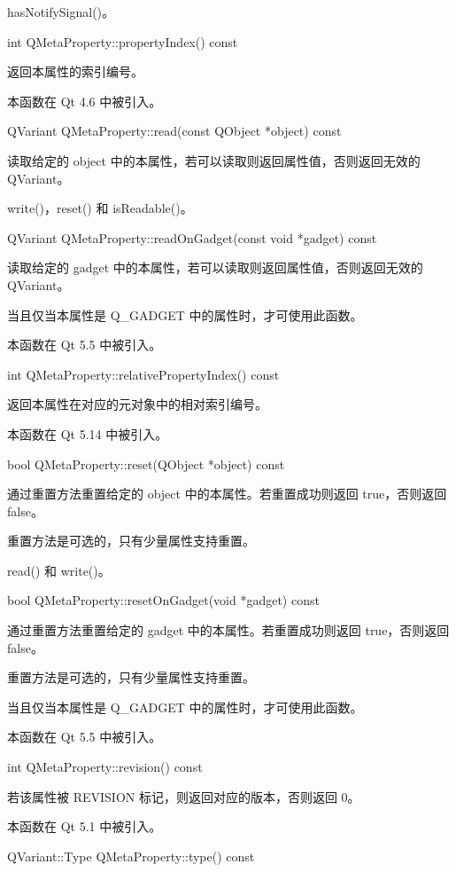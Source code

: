 \begin{seeAlso}
hasNotifySignal()。
\end{seeAlso}

int QMetaProperty::propertyIndex() const

返回本属性的索引编号。

本函数在 Qt 4.6 中被引入。

QVariant QMetaProperty::read(const QObject *object) const

读取给定的 object 中的本属性，若可以读取则返回属性值，否则返回无效的 QVariant。

\begin{seeAlso}
write()，reset() 和 isReadable()。
\end{seeAlso}

QVariant QMetaProperty::readOnGadget(const void *gadget) const

读取给定的 gadget 中的本属性，若可以读取则返回属性值，否则返回无效的 QVariant。

当且仅当本属性是 Q\_GADGET 中的属性时，才可使用此函数。

本函数在 Qt 5.5 中被引入。

int QMetaProperty::relativePropertyIndex() const

返回本属性在对应的元对象中的相对索引编号。

本函数在 Qt 5.14 中被引入。

bool QMetaProperty::reset(QObject *object) const

通过重置方法重置给定的 object 中的本属性。若重置成功则返回 true，否则返回 false。

重置方法是可选的，只有少量属性支持重置。

\begin{seeAlso}
read() 和 write()。
\end{seeAlso}

bool QMetaProperty::resetOnGadget(void *gadget) const

通过重置方法重置给定的 gadget 中的本属性。若重置成功则返回 true，否则返回 false。

重置方法是可选的，只有少量属性支持重置。

当且仅当本属性是 Q\_GADGET 中的属性时，才可使用此函数。

本函数在 Qt 5.5 中被引入。

int QMetaProperty::revision() const

若该属性被 REVISION 标记，则返回对应的版本，否则返回 0。

本函数在 Qt 5.1 中被引入。

QVariant::Type QMetaProperty::type() const

